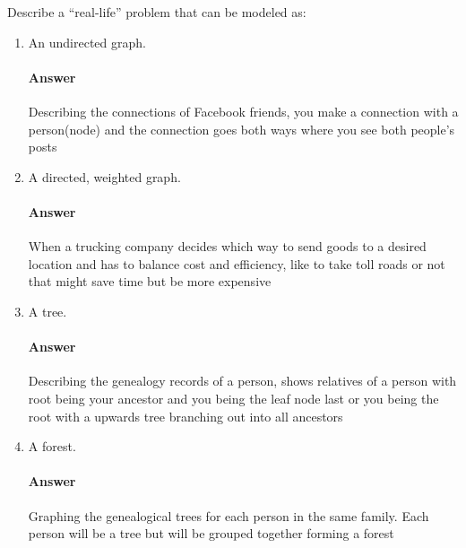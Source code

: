 \documentclass{article}
\begin{document}

Describe a ``real-life'' problem that can be modeled as:

\begin{enumerate}
    \item An undirected graph.

        \paragraph{Answer}

        Describing the connections of Facebook friends, you make a connection with a person(node) and the connection goes both ways where you see both people’s posts

    \item A directed, weighted graph.

        \paragraph{Answer}
    When a trucking company decides which way to send goods to a desired location and has to balance cost and efficiency, like to take toll roads or not that might save time but be more expensive

    \item A tree.

        \paragraph{Answer}

    Describing the genealogy records of a person, shows relatives of a person with root being your ancestor and you being the leaf node last or you being the root with a upwards tree branching out into all ancestors

    \item A forest.

        \paragraph{Answer}
    Graphing the genealogical trees for each person in the same family. Each person will be a tree but will be grouped together forming a forest

\end{enumerate}
\end{document}
